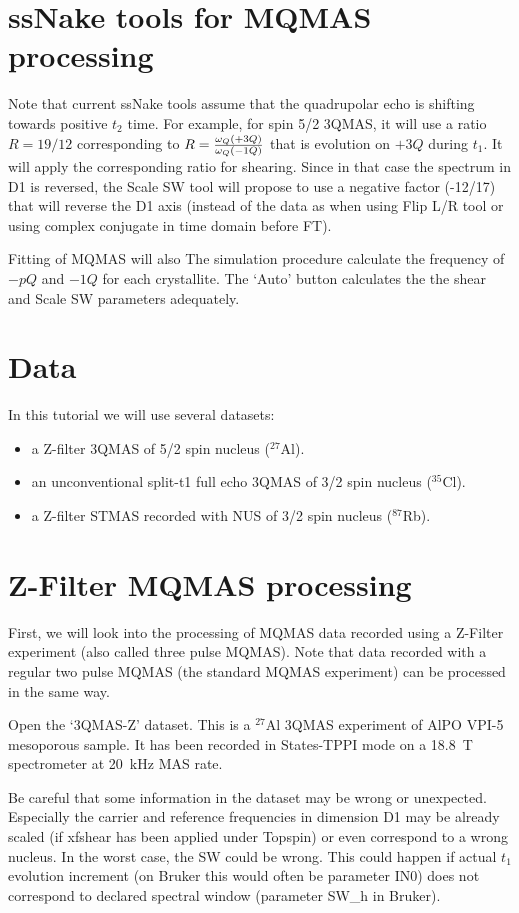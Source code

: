 \documentclass[11pt,a4paper]{article}
\begin{document}
\section{ssNake tools for MQMAS processing}
Note that current ssNake tools assume that the quadrupolar echo is shifting towards 
positive $t_2$ time. For example, for spin 5/2 3QMAS, it will use a ratio $R=19/12$ corresponding to 
$R = {\omega_Q(+3Q) \over \omega_Q(-1Q)}$ that is evolution on $+3Q$ during $t_1$. It will apply the corresponding 
ratio for shearing. Since in that case the spectrum in D1 is reversed, the Scale SW tool will propose to use
a negative factor (-12/17) that will reverse the D1 axis (instead of the data as when using Flip L/R tool or using 
complex conjugate in time domain before FT). 

Fitting of MQMAS will also
The simulation procedure calculate the frequency of $-pQ$ and $-1Q$ for each crystallite. The `Auto' button calculates the 
the shear and Scale SW parameters adequately. 

\section{Data}
In this tutorial we will use several datasets:
\begin{itemize}
\item a Z-filter 3QMAS of 5/2 spin nucleus (${}^{27}$Al).
\item an unconventional split-t1 full echo 3QMAS of 3/2 spin nucleus (${}^{35}$Cl).
\item a Z-filter STMAS recorded with NUS of 3/2 spin nucleus (${}^{87}$Rb).
\end{itemize}


\section{Z-Filter MQMAS processing}
First, we will look into the processing of MQMAS data recorded using a Z-Filter experiment (also called three pulse MQMAS).
Note that data recorded with a regular two pulse MQMAS (the standard MQMAS experiment) can be processed in the same way.

Open the `3QMAS-Z' dataset. This is a ${}^{27}$Al 3QMAS experiment of AlPO VPI-5 mesoporous sample. It has been recorded 
in States-TPPI mode on a 18.8~T spectrometer at 20~kHz MAS rate.

Be careful that some information in the dataset may be wrong or unexpected. Especially the carrier and reference frequencies
in dimension D1 may be already scaled (if xfshear has been applied under Topspin) or even correspond to a wrong nucleus. 
In the worst case, the SW could be wrong. This could happen if actual $t_1$ evolution increment (on Bruker this would often 
be parameter IN0) does not correspond to declared spectral window (parameter SW\_h in Bruker).
\end{document}
